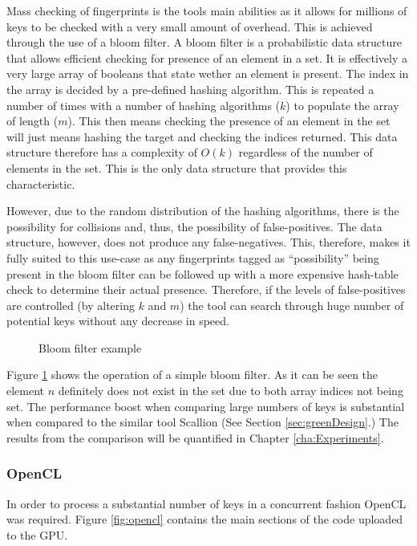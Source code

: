 Mass checking of fingerprints is the tools main abilities as it allows for millions of keys to be checked with a very small amount of overhead. This is achieved through the use of a bloom filter. A bloom filter is a probabilistic data structure that allows efficient checking for presence of an element in a set. It is effectively a very large array of booleans that state wether an element is present. The index in the array is decided by a pre-defined hashing algorithm. This is repeated a number of times with a number of hashing algorithms ($k$) to populate the array of length ($m$). This then means checking the presence of an element in the set will just means hashing the target and checking the indices returned. This data structure therefore has a complexity of $O(k)$ regardless of the number of elements in the set. This is the only data structure that provides this characteristic.

However, due to the random distribution of the hashing algorithms, there is the possibility for collisions and, thus, the possibility of false-positives. The data structure, however, does not produce any false-negatives. This, therefore, makes it fully suited to this use-case as any fingerprints tagged as ``possibility'' being present in the bloom filter can be followed up with a more expensive hash-table check to determine their actual presence. Therefore, if the levels of false-positives are controlled (by altering $k$ and $m$) the tool can search through huge number of potential keys without any decrease in speed.

\begin{figure}[h!]
    \centering
    
    \caption{Bloom filter example}
    \label{fig:bloom}
\end{figure}

Figure \ref{fig:bloom} shows the operation of a simple bloom filter. As it can be seen the element $n$ definitely does not exist in the set due to both array indices not being set. The performance boost when comparing large numbers of keys is substantial when compared to the similar tool Scallion (See Section \ref{sec:greenDesign}.) The results from the comparison will be quantified in Chapter \ref{cha:Experiments}.

\subsubsection*{OpenCL}

In order to process a substantial number of keys in a concurrent fashion OpenCL was required. Figure \ref{fig:opencl} contains the main sections of the code uploaded to the GPU.

